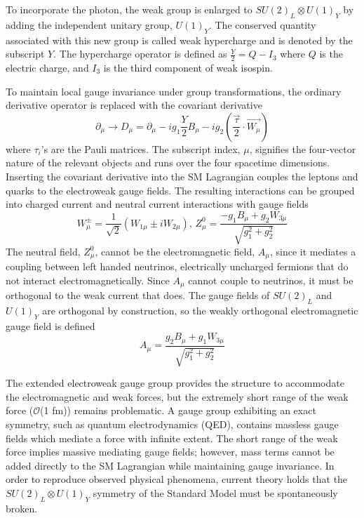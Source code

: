 To incorporate the photon, the weak group is enlarged to $SU(2)_L\otimes U(1)_Y$ by adding the independent unitary group, $U(1)_Y$. The conserved quantity associated with this new group is called weak hypercharge and is denoted by the subscript $Y$. The hypercharge operator is defined as $\frac{Y}{2}=Q-I_3$ where $Q$ is the electric charge, and $I_3$ is the third component of weak isospin.

To maintain local gauge invariance under group transformations, the ordinary derivative operator is replaced with the covariant derivative
\begin{equation}\label{covariant}
\partial_\mu\rightarrow D_\mu=\partial_\mu-ig_1\frac{Y}{2}B_\mu-ig_2\left(\frac{\vec{\tau}}{2}\cdot \vec{W_\mu} \right)
\end{equation}
where $\tau_i$'s are the Pauli matrices. The subscript index, $\mu$, signifies the four-vector nature of the relevant objects and runs over the four spacetime dimensions. Inserting the covariant derivative into the %
SM Lagrangian couples the leptons and quarks to the electroweak gauge fields. The resulting interactions can be grouped into charged current and neutral current interactions with gauge fields~\cite{Rolnick, HiggsHunter}
\begin{equation}
W_{\mu}^{\pm}=\frac{1}{\sqrt{2}}(W_{1\mu}\pm iW_{2\mu}), \,Z^0_{\mu}=\frac{-g_1B_{\mu}+g_2W_{3\mu}}{\sqrt{g_1^2+g_2^2}}
\end{equation}
The neutral field, $Z^0_{\mu}$, cannot be the electromagnetic field, $A_{\mu}$, since it mediates a coupling between left handed neutrinos, electrically uncharged fermions that do not interact electromagnetically. Since $A_{\mu}$ cannot couple to neutrinos, it must be orthogonal to the weak current that does. The gauge fields of $SU(2)_L$ and $U(1)_Y$ are orthogonal by construction, so the weakly orthogonal electromagnetic gauge field is defined
\begin{equation}
A_{\mu}=\frac{g_2B_{\mu}+g_1W_{3\mu}}{\sqrt{g_1^2+g_2^2}}
\end{equation}

The extended electroweak gauge group provides the structure to accommodate the electromagnetic and weak forces, but the extremely short range of the weak force ($\mathcal{O}$(1 fm)) remains problematic. A gauge group exhibiting an exact symmetry, such as quantum electrodynamics (QED), contains massless gauge fields which mediate a force with infinite extent. The short range of the weak force implies massive mediating gauge fields; however, mass terms cannot be added directly to the SM Lagrangian while maintaining gauge invariance. In order to reproduce observed physical phenomena, current theory holds that the $SU(2)_L\otimes U(1)_Y$ symmetry of the Standard Model must be spontaneously broken.
